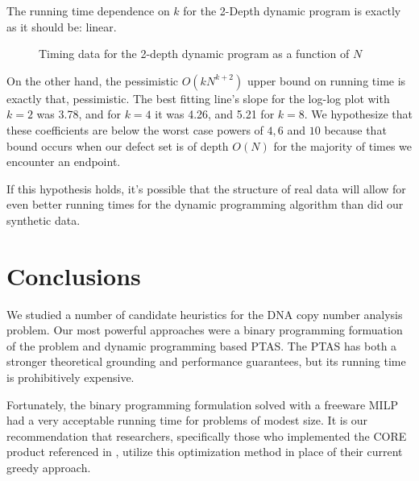 The running time dependence on $k$ for the 2-Depth dynamic program is exactly as it should be: linear.

\begin{figure}[ht!] \centering
  \caption{Timing data for the 2-depth dynamic program as a function of $N$}
\end{figure}

On the other hand, the pessimistic $O(kN^{k+2})$ upper bound on running time is exactly that, pessimistic. The best fitting line's slope for the log-log plot with $k=2$ was 3.78, and for $k=4$ it was 4.26, and 5.21 for $k=8$. We hypothesize that these coefficients are below the worst case powers of $4, 6$ and $10$ because that bound occurs when our defect set is of depth $O(N)$ for the majority of times we encounter an endpoint. 

If this hypothesis holds, it's possible that the structure of real data will allow for even better running times for the dynamic programming algorithm than did our synthetic data.

\FloatBarrier
\section{Conclusions}

We studied a number of candidate heuristics for the DNA copy number analysis problem.  Our most powerful approaches were a binary programming formuation of the problem and dynamic programming based PTAS. The PTAS has both a stronger theoretical grounding and performance guarantees, but its running time is prohibitively expensive.

Fortunately, the binary programming formulation solved with a freeware MILP had a very acceptable running time for problems of modest size.  It is our recommendation that researchers, specifically those who implemented the CORE product referenced in \cite{krasnitz2013target}, utilize this optimization method in place of their current greedy approach.
